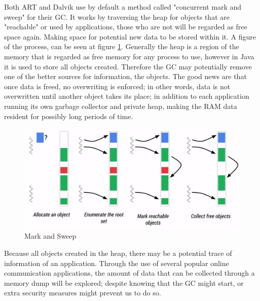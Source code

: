 Both ART and Dalvik use by default a method called "concurrent mark and sweep" for their GC\cite{ARTGC,DALVIKGC}. It works by traversing the heap for objects that are "reachable" or used by applications, those who are not will be regarded as free space again. Making space for potential new data to be stored within it. A figure of the process, can be seen at figure \ref{fig:mas}. Generally the heap is a region of the memory that is regarded as free memory for any process to use, however in Java it is used to store all objects created. Therefore the GC may potentially remove one of the better sources for information, the objects. The good news are that once data is freed, no overwriting is enforced; in other words, data is not overwritten until another object takes its place\cite{DALVIKGC}; in addition to each application running its own garbage collector and private heap, making the RAM data resident for possibly long periods of time.

\begin{figure}[h]
  \includegraphics[width=0.5 \textwidth]{gc}
  \caption{Mark and Sweep\cite{ARTGC}}
  \label{fig:mas}
\end{figure}

Because all objects created in the heap, there may be a potential trace of information of an application. Through the use of several popular online communication applications, the amount of data that can be collected through a memory dump will be explored; despite knowing that the GC might start, or extra security measures might prevent us to do so.